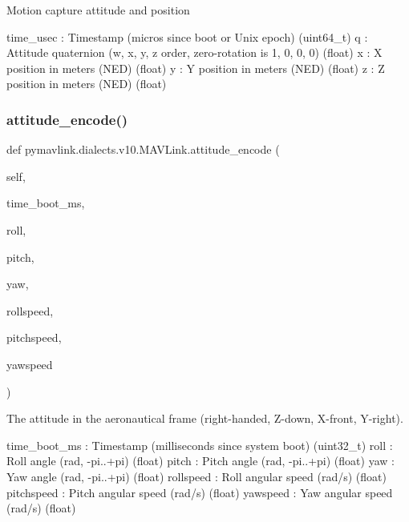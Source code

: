 \begin{DoxyVerb}Motion capture attitude and position

time_usec                 : Timestamp (micros since boot or Unix epoch) (uint64_t)
q                         : Attitude quaternion (w, x, y, z order, zero-rotation is 1, 0, 0, 0) (float)
x                         : X position in meters (NED) (float)
y                         : Y position in meters (NED) (float)
z                         : Z position in meters (NED) (float)\end{DoxyVerb}
 \mbox{\label{classpymavlink_1_1dialects_1_1v10_1_1MAVLink_a582b5974f4a4685bd63147dda004ad43}} 
\subsubsection{\texorpdfstring{attitude\+\_\+encode()}{attitude\_encode()}}
{\footnotesize\ttfamily def pymavlink.\+dialects.\+v10.\+M\+A\+V\+Link.\+attitude\+\_\+encode (\begin{DoxyParamCaption}\item[{}]{self,  }\item[{}]{time\+\_\+boot\+\_\+ms,  }\item[{}]{roll,  }\item[{}]{pitch,  }\item[{}]{yaw,  }\item[{}]{rollspeed,  }\item[{}]{pitchspeed,  }\item[{}]{yawspeed }\end{DoxyParamCaption})}

\begin{DoxyVerb}The attitude in the aeronautical frame (right-handed, Z-down, X-front,
Y-right).

time_boot_ms              : Timestamp (milliseconds since system boot) (uint32_t)
roll                      : Roll angle (rad, -pi..+pi) (float)
pitch                     : Pitch angle (rad, -pi..+pi) (float)
yaw                       : Yaw angle (rad, -pi..+pi) (float)
rollspeed                 : Roll angular speed (rad/s) (float)
pitchspeed                : Pitch angular speed (rad/s) (float)
yawspeed                  : Yaw angular speed (rad/s) (float)\end{DoxyVerb}
 \mbox{\label{classpymavlink_1_1dialects_1_1v10_1_1MAVLink_ac63cf70d2356bc63386d0d4a78592382}} 
